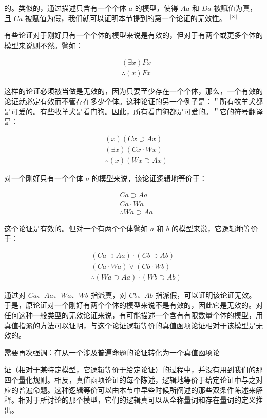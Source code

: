的。类似的，通过描述只含有一个个体 $a$ 的模型，使得 $A a$ 和 $D a$ 被赋值为真，且 $C a$ 被赋值为假，我们就可以证明本节提到的第一个论证的无效性。 ${ }^{[8]}$

有些论证对于刚好只有一个个体的模型来说是有效的，但对于有两个或更多个体的模型来说则不然。譬如：

$$
\begin{aligned}
& (\exists x) F x \\
& \therefore(x) F x
\end{aligned}
$$

这样的论证必须被当做是无效的，因为只要至少存在一个个体，那么，一个有效的论证就必定有效而不管存在多少个体。这种论证的另一个例子是：＂所有牧羊犬都是可爱的。有些牧羊犬是看门狗。因此，所有看门狗都是可爱的。＂它的符号翻译是：

$$
\begin{aligned}
& (x)(C x \supset A x) \\
& (\exists x)(C x \cdot W x) \\
& \therefore(x)(W x \supset A x)
\end{aligned}
$$

对一个刚好只有一个个体 $a$ 的模型来说，该论证逻辑地等价于：

$$
\begin{aligned}
& C a \supset A a \\
& C a \cdot W a \\
& \therefore W a \supset A a
\end{aligned}
$$

这个论证是有效的。但对一个有两个个体譬如 $a$ 和 $b$ 的模型来说，它逻辑地等价于：

$$
\begin{aligned}
& (C a \supset A a) \cdot(C b \supset A b) \\
& (C a \cdot W a) \vee(C b \cdot W b) \\
& \therefore(W a \supset A a) \cdot(W b \supset A b)
\end{aligned}
$$

通过对 $C a 、 A a 、 W a 、 W b$ 指派真，对 $C b 、 A b$ 指派假，可以证明该论证无效。于是，原论证对一个刚好有两个个体的模型来说不是有效的，因此它是无效的。对任何这种一般类型的无效论证来说，有可能描述一个含有有限数量个体的模型，用真值指派的方法可以证明，与这个论证逻辑等价的真值函项论证相对于该模型是无效的。

需要再次强调：在从一个涉及普遍命题的论证转化为一个真值函项论

证（相对于某特定模型，它逻辑等价于给定论证）的过程中，并没有用到我们的那四个量化规则。相反，真值函项论证的每个陈述，逻辑地等价于给定论证中与之对应的普遍命题。这种逻辑等价可以由本节中早些时候所阐述的那些双条件陈述来解释。相对于所讨论的那个模型，它们的逻辑真可以从全称量词和存在量词的定义推出。

